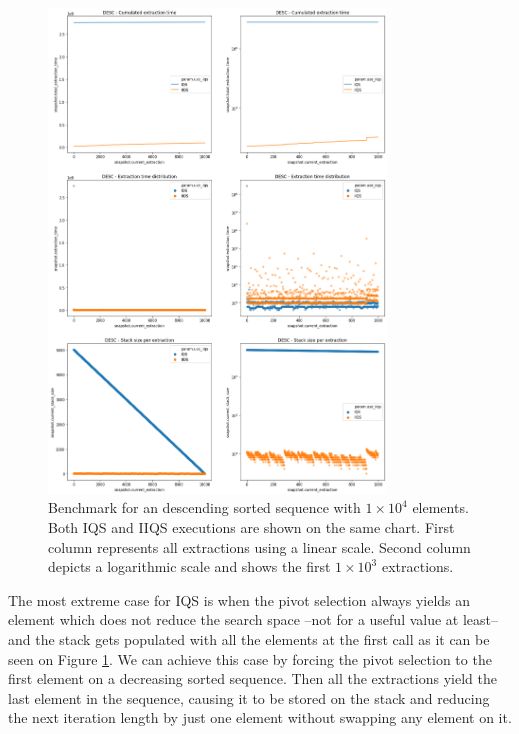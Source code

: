 \begin{figure}[!ht]
    \centering
    \includegraphics[width=0.8\textwidth]{./fragments/04_experimental_execution/images/01_basebenchmark_03_sort_d_case.png}
    \caption{Benchmark for an descending sorted sequence with $1\times10^4$ elements. Both IQS and IIQS executions are shown on the same chart. First column represents all extractions using a linear scale. Second column depicts a logarithmic scale and shows the first $1\times10^3$ extractions.}
    \label{FIG:BENCHMARK_03_DESC_CASE}
\end{figure}

The most extreme case for IQS is when the pivot selection always yields an element which does not reduce the search space --not for a useful value at least-- and the stack gets populated with all the elements at the first call as it can be seen on Figure \ref{FIG:BENCHMARK_03_DESC_CASE}. We can achieve this case by forcing the pivot selection to the first element on a decreasing sorted sequence. Then all the extractions yield the last element in the sequence, causing it to be stored on the stack and reducing the next iteration length by just one element without swapping any element on it.

